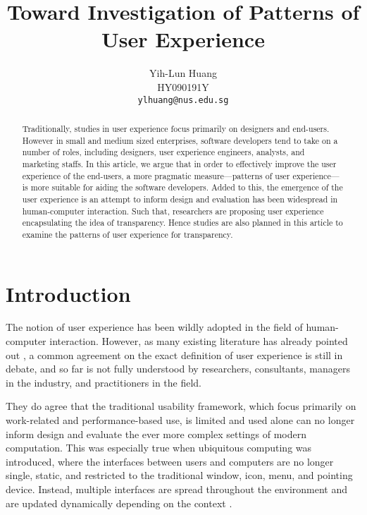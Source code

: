 \documentclass[a4paper,titlepage]{article}
\begin{document}
\title{Toward Investigation of Patterns of User Experience}

\author{Yih-Lun Huang\\
HY090191Y\\
\texttt{ylhuang@nus.edu.sg}}

\maketitle


\begin{abstract}
Traditionally, studies in user experience focus primarily on designers
and end-users. However in small and medium sized enterprises, software
developers tend to take on a number of roles, including designers,
user experience engineers, analysts, and marketing staffs. In this
article, we argue that in order to effectively improve the user
experience of the end-users, a more pragmatic measure---patterns of
user experience---is more suitable for aiding the software
developers. Added to this, the emergence of the user experience is an
attempt to inform design and evaluation has been widespread in
human-computer interaction. Such that, researchers are proposing user
experience encapsulating the idea of transparency. Hence studies are
also planned in this article to examine the patterns of user
experience for transparency.
\end{abstract}


\tableofcontents
\newpage


\section{Introduction}
\label{sec:introduction}
The notion of user experience has been wildly adopted in the field of
human-computer interaction. However, as many existing literature has
already pointed out \citep{ux:hassenzahl, ux:law}, a common agreement
on the exact definition of user experience is still in debate, and so
far is not fully understood by researchers, consultants, managers in
the industry, and practitioners in the field.

They do agree that the traditional usability framework, which focus
primarily on work-related and performance-based use, is limited and
used alone can no longer inform design and evaluate the ever more
complex settings of modern computation. This was especially true when
ubiquitous computing was introduced, where the interfaces between
users and computers are no longer single, static, and restricted to
the traditional window, icon, menu, and pointing device. Instead,
multiple interfaces are spread throughout the environment and are
updated dynamically depending on the context \citep{windows:bolter}.
\end{document}
